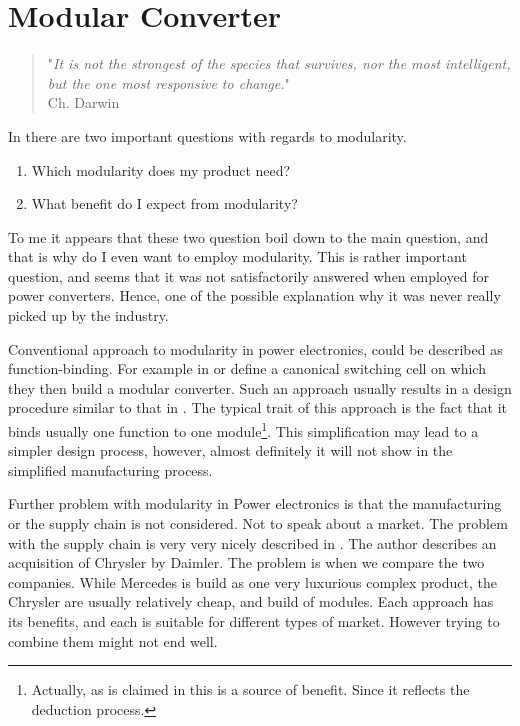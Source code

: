 \documentclass[]{scrartcl}
\begin{document}
\newpage
\section{Modular Converter}
\begin{quote}
	"\emph{It is not the strongest of the species that survives, nor the most intelligent, but the one most responsive to change.}" \\
	Ch. Darwin \\
\end{quote}

In \cite{Bradshaw2015} there are two important questions with regards to modularity. 
\begin{enumerate}
	\item Which modularity does my product need?
	\item What benefit do I expect from modularity?
\end{enumerate}

To me it appears that these two question boil down to the main question, and that is why do I even want to employ modularity. This is rather important question, and seems that it was not satisfactorily answered when employed for power converters. Hence, one of the possible explanation why it was never really picked up by the industry. 

Conventional approach to modularity in power electronics, could be described as function-binding. For example in \cite{Khan2007} or \cite{Kenzelmann2012a} define a canonical switching cell on which they then build a modular converter. Such an approach usually results in a design procedure similar to that in \cite{Ortjohann2009}. The typical trait of this approach is the fact that it binds usually one function to one module\footnote{Actually, as is claimed in \cite{Li2006} this is a source of benefit. Since it reflects the deduction process.}. This simplification may lead to a simpler design process, however, almost definitely it will not show in the simplified manufacturing process. 

Further problem with modularity in Power electronics is that the manufacturing or the supply chain is not considered. Not to speak about a market. The problem with the supply chain is very very nicely described in \cite{Fine2005}. The author describes an acquisition of Chrysler by Daimler. The problem is when we compare the two companies. While Mercedes is build as one very luxurious complex product, the Chrysler are usually relatively cheap, and build of modules. Each approach has its benefits, and each is suitable for different types of market. However trying to combine them might not end well. 
\end{document}
